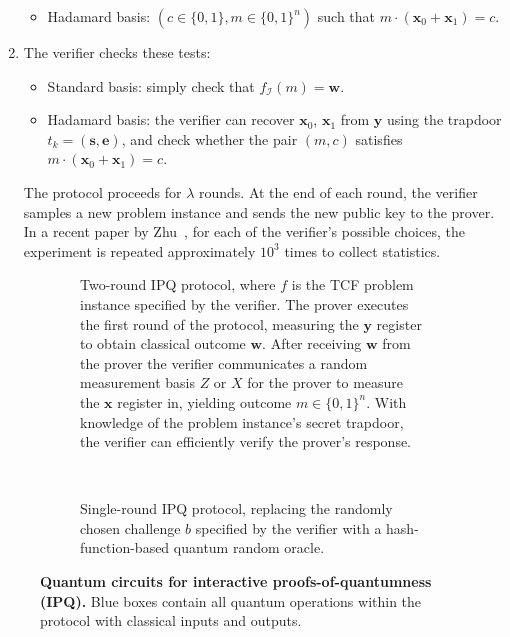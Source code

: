 \begin{enumerate}
\begin{itemize}
        \item Hadamard basis: $(c\in\{0,1\},m\in\{0,1\}^n)$ such that $m\cdot(\mathbf{x}_0+\mathbf{x}_1)=c$.
    \end{itemize}
    \item The verifier checks these tests: 
    \begin{itemize}
        \item Standard basis: simply check that $f_{\mathcal{I}}(m)=\mathbf{w}$.
        \item Hadamard basis: the verifier can recover $\mathbf{x}_0$, $\mathbf{x}_1$ from $\mathbf{y}$ using the trapdoor $t_k=(\mathbf{s},\mathbf{e})$, and check whether the pair $(m,c)$ satisfies $m\cdot(\mathbf{x}_0+\mathbf{x}_1)=c$.
    \end{itemize}

The protocol proceeds for $\lambda$ rounds. At the end of each round, the verifier samples a new problem instance and sends the new public key to the prover.
In a recent paper by Zhu~\cite{experiment_interactive_PoQ}, for each of the verifier’s possible choices, the experiment is repeated approximately $10^3$ times to collect statistics. 
\end{enumerate}

\begin{figure}[!htp]
	\centering
	\begin{subfigure}[c]{\linewidth}
			
			\caption{Two-round IPQ protocol, where $f$ is the TCF problem instance specified by the verifier. The prover executes the first round of the protocol, measuring the $\mathbf{y}$ register to obtain classical outcome $\mathbf{w}$. After receiving $\mathbf{w}$ from the prover the verifier communicates a random measurement basis $Z$ or $X$ for the prover to measure the $\mathbf{x}$ register in, yielding outcome $m\in\{0,1\}^n$. With knowledge of the problem instance's secret trapdoor, the verifier can efficiently verify the prover's response.}
	\end{subfigure}\label{fig:ipqlwe}
 \\
	\begin{subfigure}[c]{\linewidth}
		
		\caption{Single-round IPQ protocol, replacing the randomly chosen challenge $b$ specified by the verifier with a hash-function-based quantum random oracle.}
	\end{subfigure}\label{fig:ipqrlwe}
	\caption{\textbf{Quantum circuits for interactive proofs-of-quantumness (IPQ).} Blue boxes contain all quantum operations within the protocol with classical inputs and outputs.} \label{fig:IPQ_circuit.tex}
\end{figure}

